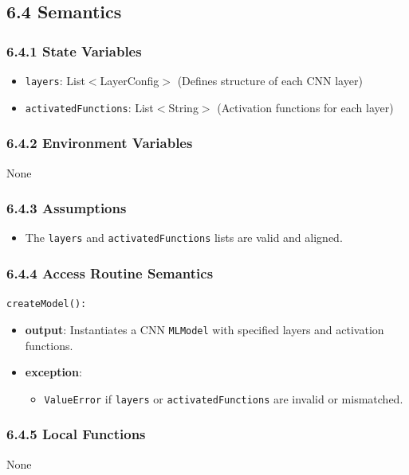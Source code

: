 \documentclass[12pt, titlepage]{article}
\begin{document}
\subsection{6.4 Semantics}

\subsubsection{6.4.1 State Variables}
\begin{itemize}
    \item \texttt{layers}: List$<$LayerConfig$>$ (Defines structure of each CNN layer)
    \item \texttt{activatedFunctions}: List$<$String$>$ (Activation functions for each layer)
\end{itemize}

\subsubsection{6.4.2 Environment Variables}
None

\subsubsection{6.4.3 Assumptions}
\begin{itemize}
    \item The \texttt{layers} and \texttt{activatedFunctions} lists are valid and aligned.
\end{itemize}

\subsubsection{6.4.4 Access Routine Semantics}
\noindent \texttt{createModel():}
\begin{itemize}
    \item \textbf{output}: Instantiates a CNN \texttt{MLModel} with specified layers and activation functions.
    \item \textbf{exception}:
    \begin{itemize}
        \item \texttt{ValueError} if \texttt{layers} or \texttt{activatedFunctions} are invalid or mismatched.
    \end{itemize}
\end{itemize}

\subsubsection{6.4.5 Local Functions}
None
\end{document}
